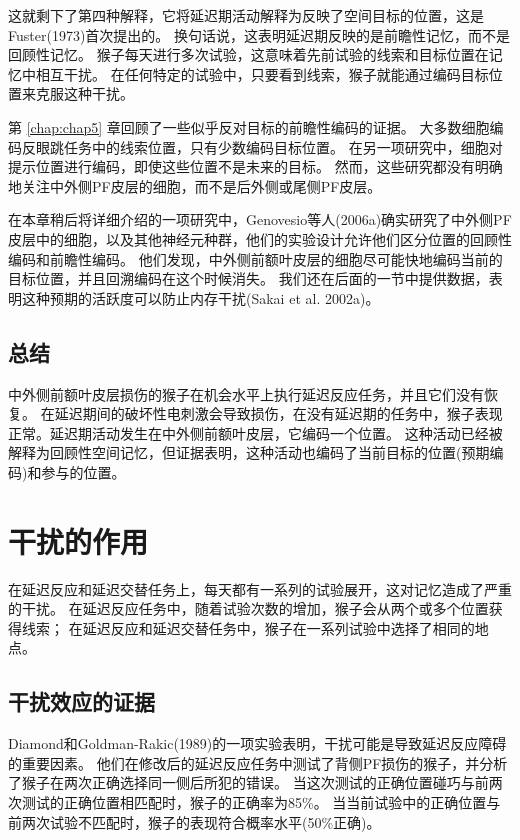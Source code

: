 这就剩下了第四种解释，它将延迟期活动解释为反映了空间目标的位置，这是Fuster(1973)首次提出的。
换句话说，这表明延迟期反映的是前瞻性记忆，而不是回顾性记忆。
猴子每天进行多次试验，这意味着先前试验的线索和目标位置在记忆中相互干扰。
在任何特定的试验中，只要看到线索，猴子就能通过编码目标位置来克服这种干扰。


第 \ref{chap:chap5} 章回顾了一些似乎反对目标的前瞻性编码的证据。
大多数细胞编码反眼跳任务中的线索位置，只有少数编码目标位置。
在另一项研究中，细胞对提示位置进行编码，即使这些位置不是未来的目标。
然而，这些研究都没有明确地关注中外侧PF皮层的细胞，而不是后外侧或尾侧PF皮层。


在本章稍后将详细介绍的一项研究中，Genovesio等人(2006a)确实研究了中外侧PF皮层中的细胞，以及其他神经元种群，他们的实验设计允许他们区分位置的回顾性编码和前瞻性编码。
他们发现，中外侧前额叶皮层的细胞尽可能快地编码当前的目标位置，并且回溯编码在这个时候消失。
我们还在后面的一节中提供数据，表明这种预期的活跃度可以防止内存干扰(Sakai et al. 2002a)。



\subsection{总结}

中外侧前额叶皮层损伤的猴子在机会水平上执行延迟反应任务，并且它们没有恢复。
在延迟期间的破坏性电刺激会导致损伤，在没有延迟期的任务中，猴子表现正常。延迟期活动发生在中外侧前额叶皮层，它编码一个位置。
这种活动已经被解释为回顾性空间记忆，但证据表明，这种活动也编码了当前目标的位置(预期编码)和参与的位置。



\section{干扰的作用}

在延迟反应和延迟交替任务上，每天都有一系列的试验展开，这对记忆造成了严重的干扰。
在延迟反应任务中，随着试验次数的增加，猴子会从两个或多个位置获得线索；
在延迟反应和延迟交替任务中，猴子在一系列试验中选择了相同的地点。



\subsection{干扰效应的证据}

Diamond和Goldman-Rakic(1989)的一项实验表明，干扰可能是导致延迟反应障碍的重要因素。
他们在修改后的延迟反应任务中测试了背侧PF损伤的猴子，并分析了猴子在两次正确选择同一侧后所犯的错误。
当这次测试的正确位置碰巧与前两次测试的正确位置相匹配时，猴子的正确率为85\%。
当当前试验中的正确位置与前两次试验不匹配时，猴子的表现符合概率水平(50\%正确)。


